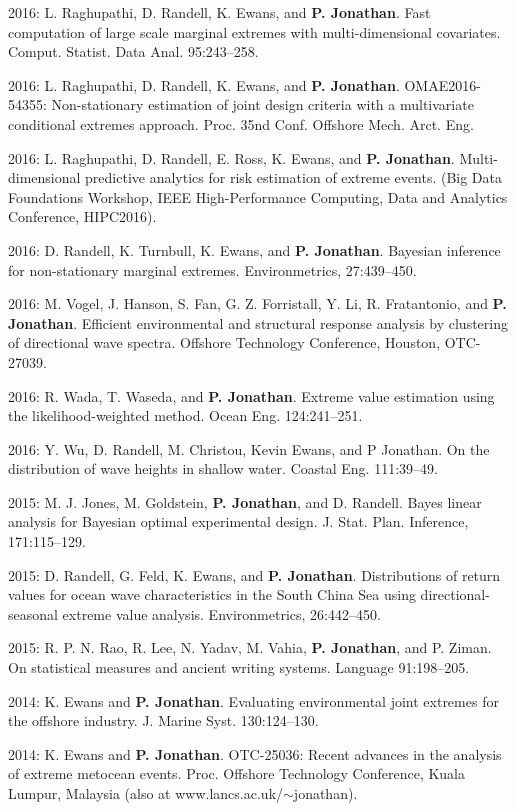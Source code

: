 \documentclass[11pt,a4paper]{moderncv}
\begin{document}
2016: L. Raghupathi, D. Randell, K. Ewans, and \textbf{P. Jonathan}. Fast computation of large scale marginal extremes with multi-dimensional covariates. Comput. Statist. Data Anal. 95:243--258.

2016: L. Raghupathi, D. Randell, K. Ewans, and \textbf{P. Jonathan}. OMAE2016-54355: Non-stationary estimation of joint design criteria with a multivariate conditional extremes approach. Proc. 35nd Conf. Offshore Mech. Arct. Eng.

2016: L. Raghupathi, D. Randell, E. Ross, K. Ewans, and \textbf{P. Jonathan}. Multi-dimensional predictive analytics for risk estimation of extreme events. (Big Data Foundations Workshop, IEEE High-Performance Computing, Data and Analytics Conference, HIPC2016).

2016: D. Randell, K. Turnbull, K. Ewans, and \textbf{P. Jonathan}. Bayesian inference for non-stationary marginal extremes. Environmetrics, 27:439--450.

2016: M. Vogel, J. Hanson, S. Fan, G. Z. Forristall, Y. Li, R. Fratantonio, and \textbf{P. Jonathan}. Efficient environmental and structural response analysis by clustering of directional wave spectra. Offshore Technology Conference, Houston, OTC-27039.

2016: R. Wada, T. Waseda, and \textbf{P. Jonathan}. Extreme value estimation using the likelihood-weighted method. Ocean Eng. 124:241--251.

2016: Y. Wu, D. Randell, M. Christou, Kevin Ewans, and P Jonathan. On the distribution of wave heights in shallow water. Coastal Eng. 111:39--49.

2015: M. J. Jones, M. Goldstein, \textbf{P. Jonathan}, and D. Randell. Bayes linear analysis for Bayesian optimal experimental design. J. Stat. Plan. Inference, 171:115--129.

2015: D. Randell, G. Feld, K. Ewans, and \textbf{P. Jonathan}. Distributions of return values for ocean wave characteristics in the South China Sea using directional-seasonal extreme value analysis. Environmetrics, 26:442--450.

2015: R. P. N. Rao, R. Lee, N. Yadav, M. Vahia, \textbf{P. Jonathan}, and P. Ziman. On statistical measures and ancient writing systems. Language 91:198--205.

2014: K. Ewans and \textbf{P. Jonathan}. Evaluating environmental joint extremes for the offshore industry. J. Marine Syst. 130:124--130.

2014: K. Ewans and \textbf{P. Jonathan}. OTC-25036: Recent advances in the analysis of extreme metocean events. Proc. Offshore Technology Conference, Kuala Lumpur, Malaysia (also at www.lancs.ac.uk/$\sim$jonathan). 
\end{document}
